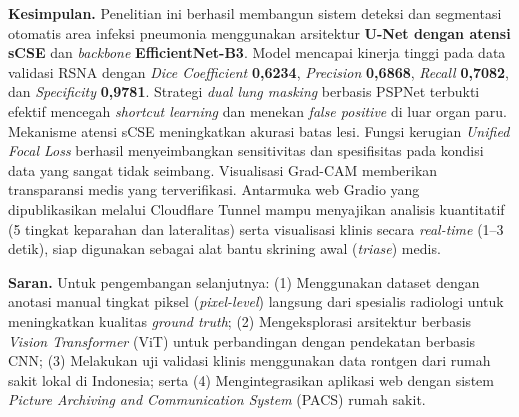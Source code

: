 \documentclass[12pt,a4paper,twocolumn]{article}
\begin{document}
\textbf{Kesimpulan.} Penelitian ini berhasil membangun sistem deteksi dan
segmentasi otomatis area infeksi pneumonia menggunakan arsitektur
\textbf{U-Net dengan atensi sCSE} dan \textit{backbone}
\textbf{EfficientNet-B3}. Model mencapai kinerja tinggi pada data validasi
RSNA dengan \textit{Dice Coefficient} \textbf{0,6234}, \textit{Precision}
\textbf{0,6868}, \textit{Recall} \textbf{0,7082}, dan \textit{Specificity}
\textbf{0,9781}. Strategi \textit{dual lung masking} berbasis PSPNet terbukti
efektif mencegah \textit{shortcut learning} dan menekan \textit{false positive}
di luar organ paru. Mekanisme atensi sCSE meningkatkan akurasi batas lesi.
Fungsi kerugian \textit{Unified Focal Loss} berhasil menyeimbangkan sensitivitas
dan spesifisitas pada kondisi data yang sangat tidak seimbang. Visualisasi
Grad-CAM memberikan transparansi medis yang terverifikasi. Antarmuka web Gradio
yang dipublikasikan melalui Cloudflare Tunnel mampu menyajikan analisis
kuantitatif (5 tingkat keparahan dan lateralitas) serta visualisasi klinis
secara \textit{real-time} (1--3 detik), siap digunakan sebagai alat bantu
skrining awal (\textit{triase}) medis.

\textbf{Saran.} Untuk pengembangan selanjutnya: (1) Menggunakan dataset dengan
anotasi manual tingkat piksel (\textit{pixel-level}) langsung dari spesialis
radiologi untuk meningkatkan kualitas \textit{ground truth}; (2) Mengeksplorasi
arsitektur berbasis \textit{Vision Transformer} (ViT) untuk perbandingan dengan
pendekatan berbasis CNN; (3) Melakukan uji validasi klinis menggunakan data
rontgen dari rumah sakit lokal di Indonesia; serta (4) Mengintegrasikan aplikasi
web dengan sistem \textit{Picture Archiving and Communication System} (PACS)
rumah sakit.


\end{document}
